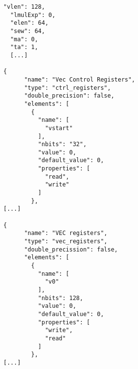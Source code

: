\begin{lstlisting}[basicstyle=\scriptsize, caption=Definición de la arquitectura: parámetros configurables y bancos de registros, label={lst:arch-def}]
  "vlen": 128,
  "lmulExp": 0,
  "elen": 64,
  "sew": 64,
  "ma": 0,
  "ta": 1,
  [...]

{
      "name": "Vec Control Registers",
      "type": "ctrl_registers",
      "double_precision": false,
      "elements": [
        {
          "name": [
            "vstart"
          ],
          "nbits": "32",
          "value": 0,
          "default_value": 0,
          "properties": [
            "read",
            "write"
          ]
        },
[...]

{
      "name": "VEC registers",
      "type": "vec_registers",
      "double_precission": false,
      "elements": [
        {
          "name": [
            "v0"
          ],
          "nbits": 128,
          "value": 0,
          "default_value": 0,
          "properties": [
            "write",
            "read"
          ]
        },
[...]
\end{lstlisting}


